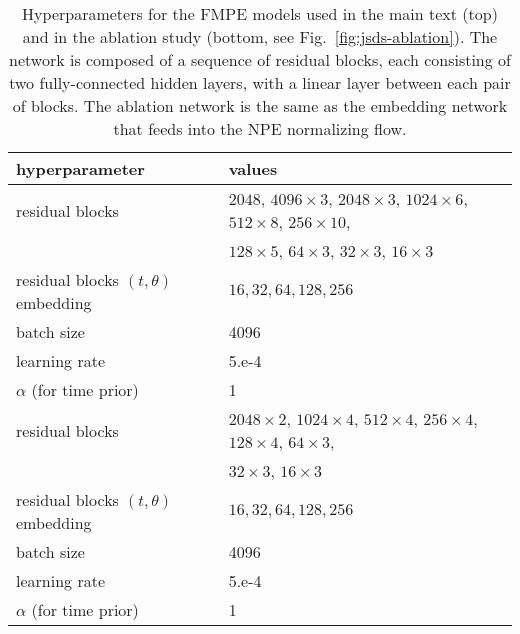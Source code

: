 \documentclass{article}
\theoremstyle{remark}
\begin{document}
\begin{table}
    \centering
    \caption{\label{tab:fmpe-gw-hyperparameters}
       Hyperparameters for the FMPE models used in the main text (top) and in the ablation study (bottom, see Fig.~\ref{fig:jsds-ablation}). The network is composed of a sequence of residual blocks, each consisting of two fully-connected hidden layers, with a linear layer between each pair of blocks. The ablation network is the same as the embedding network that feeds into the NPE normalizing flow.
    }
    \begin{tabular}{lp{8cm}}
        \toprule
        hyperparameter & values \\\midrule
        residual blocks & $2048$, $4096 \times 3$, $2048 \times 3$, $1024 \times 6$, $512 \times 8$, $256 \times 10$,\\
        &$128 \times 5$, $64 \times 3$, $32 \times 3$, $16 \times 3$ \\
        residual blocks $(t, \theta)$ embedding & $16, 32, 64, 128, 256$\\
        batch size & 4096\\
        learning rate & 5.e-4\\
        $\alpha$ (for time prior) & 1\\\midrule
        residual blocks & $2048 \times 2$, $1024 \times 4$, $512 \times 4$, $256 \times 4$, $128 \times 4$, $64 \times 3$,\\
        &$32 \times 3$, $16 \times 3$  \\
        residual blocks $(t, \theta)$ embedding & $16, 32, 64, 128, 256$\\
        batch size & 4096\\
        learning rate & 5.e-4\\
        $\alpha$ (for time prior) & 1\\\bottomrule
    \end{tabular}
\end{table}
\end{document}
